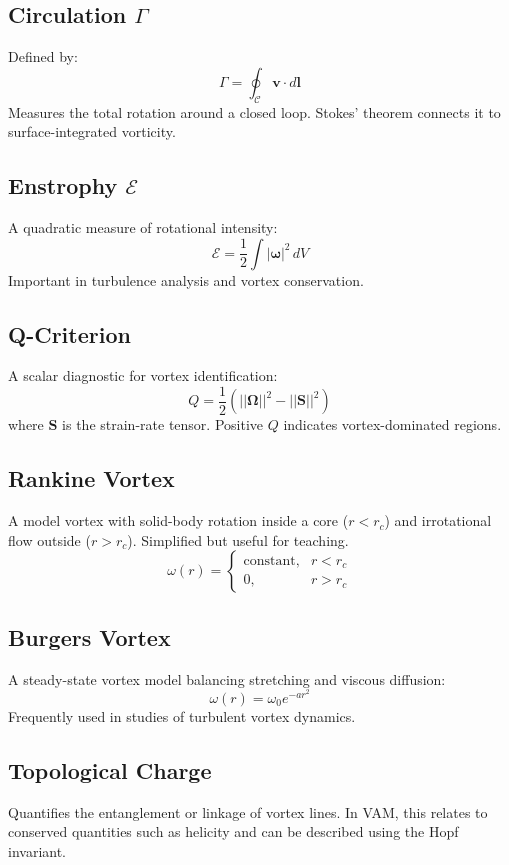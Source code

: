 \documentclass[a4paper, aps,preprint,superscriptaddress, 12pt]{revtex4}
\begin{document}
    \subsection*{Circulation $\Gamma$}
    Defined by:
    \[ \Gamma = \oint_{\mathcal{C}} \mathbf{v} \cdot d\mathbf{l} \]
    Measures the total rotation around a closed loop. Stokes' theorem connects it to surface-integrated vorticity.

    \subsection*{Enstrophy $\mathcal{E}$}
    A quadratic measure of rotational intensity:
    \[ \mathcal{E} = \frac{1}{2} \int |\boldsymbol{\omega}|^2 \, dV \]
    Important in turbulence analysis and vortex conservation.

    \subsection*{Q-Criterion}
    A scalar diagnostic for vortex identification:
    \[ Q = \frac{1}{2}(||\boldsymbol{\Omega}||^2 - ||\mathbf{S}||^2) \]
    where $\mathbf{S}$ is the strain-rate tensor. Positive $Q$ indicates vortex-dominated regions.

    \subsection*{Rankine Vortex}
    A model vortex with solid-body rotation inside a core ($r < r_c$) and irrotational flow outside ($r > r_c$). Simplified but useful for teaching.
    \[ \omega(r) =
    \begin{cases}
        \text{constant}, & r < r_c \\
        0, & r > r_c
    \end{cases}
    \]

    \subsection*{Burgers Vortex}
    A steady-state vortex model balancing stretching and viscous diffusion:
    \[ \omega(r) = \omega_0 e^{-a r^2} \]
    Frequently used in studies of turbulent vortex dynamics.

    \subsection*{Topological Charge}
    Quantifies the entanglement or linkage of vortex lines. In VAM, this relates to conserved quantities such as helicity and can be described using the Hopf invariant.
\end{document}

